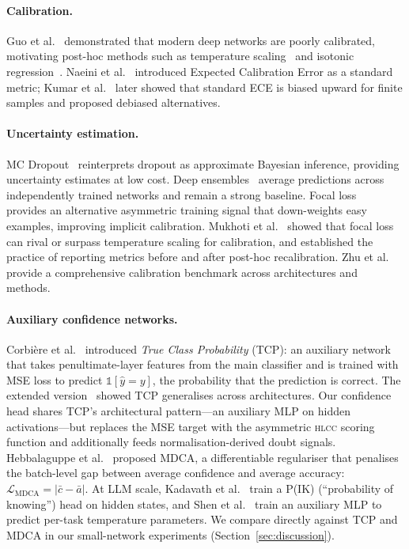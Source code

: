 \documentclass[11pt,a4paper]{article}
\newcommand{\hlcc}{\textsc{hlcc}}
\begin{document}
\paragraph{Calibration.}
Guo et al.~\cite{guo2017calibration} demonstrated that modern deep
networks are poorly calibrated, motivating post-hoc methods such as
temperature scaling~\cite{platt1999probabilistic} and isotonic
regression~\cite{zadrozny2002transforming}.  Naeini et
al.~\cite{naeini2015obtaining} introduced Expected Calibration Error
as a standard metric; Kumar et al.~\cite{kumar2019verified} later
showed that standard ECE is biased upward for finite samples and
proposed debiased alternatives.

\paragraph{Uncertainty estimation.}
MC Dropout~\cite{gal2016dropout} reinterprets dropout as approximate
Bayesian inference, providing uncertainty estimates at low cost.
Deep ensembles~\cite{lakshminarayanan2017simple} average predictions
across independently trained networks and remain a strong baseline.
Focal loss~\cite{lin2017focal} provides an alternative asymmetric
training signal that down-weights easy examples, improving implicit
calibration.  Mukhoti et al.~\cite{mukhoti2020calibrating} showed that
focal loss can rival or surpass temperature scaling for calibration,
and established the practice of reporting metrics before and after
post-hoc recalibration.  Zhu et al.~\cite{zhu2024calibration} provide
a comprehensive calibration benchmark across architectures and methods.

\paragraph{Auxiliary confidence networks.}
Corbi\`ere et al.~\cite{corbiere2019addressing} introduced
\emph{True Class Probability} (TCP): an auxiliary network that takes
penultimate-layer features from the main classifier and is trained
with MSE loss to predict $\mathbb{1}[\hat{y} = y]$, the probability
that the prediction is correct.  The extended version~\cite{corbiere2022confidence}
showed TCP generalises across architectures.  Our confidence head shares
TCP's architectural pattern---an auxiliary MLP on hidden
activations---but replaces the MSE target with the asymmetric \hlcc{}
scoring function and additionally feeds normalisation-derived doubt
signals.  Hebbalaguppe et al.~\cite{hebbalaguppe2022stitch}
proposed MDCA, a differentiable regulariser that penalises the
batch-level gap between average confidence and average accuracy:
$\mathcal{L}_\text{MDCA} = |\bar{c} - \bar{a}|$.  At LLM scale,
Kadavath et al.~\cite{kadavath2022language} train a P(IK)
(``probability of knowing'') head on hidden states, and
Shen et al.~\cite{shen2024thermometer} train an auxiliary MLP
to predict per-task temperature parameters.  We compare directly
against TCP and MDCA in our small-network experiments
(Section~\ref{sec:discussion}).
\end{document}
